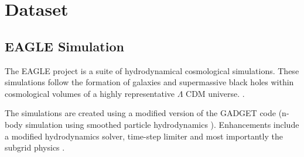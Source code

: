 \documentclass[12pt, onecolumn]{article}
\begin{document}
\newpage

\section{Dataset}
\label{Dataset}

    \subsection{EAGLE Simulation}
    
        
        


        The EAGLE project \cite{eagle_schaye} is a suite of hydrodynamical cosmological simulations. These simulations follow the formation of galaxies and supermassive black holes within cosmological volumes of a highly representative $\Lambda$ CDM universe. \cite{eagle_schaye}.

        The simulations are created using a modified version of the GADGET code (n-body simulation using smoothed particle hydrodynamics \cite{gadget_code}). Enhancements include a modified hydrodynamics solver, time-step limiter and most importantly the subgrid physics \cite{eagle_catalogue_public_release}.

\end{document}
